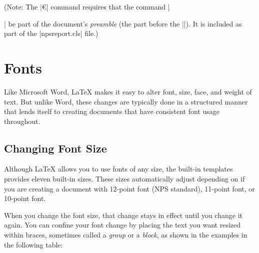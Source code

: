 (Note: The |\euro| command requires that the command
|\usepackage{eurosym}| be part of the document's \emph{preamble} (the
part before the ||). It is included as part of the
|npsreport.cls| file.)

\section{Fonts}
Like Microsoft Word, \LaTeX{} makes it easy to alter font, size, face,
and weight of text. But unlike Word, these changes are typically done
in a structured manner that lends itself to creating documents that
have consistent font usage throughout. 

\subsection{Changing Font Size}
Although \LaTeX{} allows you to use fonts of any size, the built-in
templates provides eleven built-in sizes. These sizes automatically
adjust depending on if you are creating a document with 12-point font
(NPS standard), 11-point font, or 10-point font. 

When you change the font size, that change stays in effect until you
change it again. You can confine your font change by placing the text
you want resized within braces, sometimes called a \emph{group} or a
\emph{block}, as shown in the examples in the
following table:

